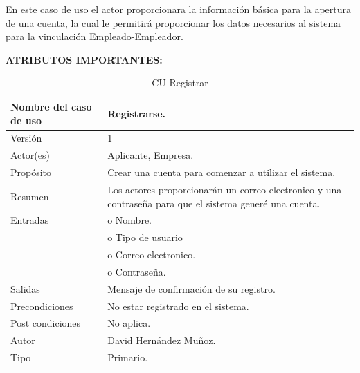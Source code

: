 En este caso de uso el actor proporcionara la información básica para la apertura de una cuenta, la cual le permitirá proporcionar los datos necesarios al sistema para la vinculación Empleado-Empleador.\newline \newline


\textbf{ATRIBUTOS IMPORTANTES:}

\begin{table}[h]			
        \begin{center}			
        \begin{tabular}{|l|p{11cm}|} \hline
        
        			
Nombre del caso de uso	&	Registrarse.	\\ \hline
Versión	&	1	\\ \hline
Actor(es)	&	Aplicante, Empresa.	\\ \hline
Propósito	&	Crear una cuenta para comenzar a utilizar el sistema.	\\ \hline
Resumen	&	Los actores proporcionarán un correo electronico y una contraseña para que el sistema generé una cuenta.	\\ \hline
Entradas	&	o         Nombre.	\\ 
	&	o         Tipo de usuario	\\
	&	o         Correo electronico.	\\
	&	o         Contraseña.	\\ \hline
Salidas	&	Mensaje de confirmación de su registro.	\\ \hline
Precondiciones	&	No estar registrado en el sistema.	\\ \hline
Post condiciones	&	No aplica.	\\ \hline
Autor	&	David Hernández Muñoz.	\\ \hline
Tipo	&	Primario.	\\ \hline



\end{tabular}			
        \caption	{	CU Registrar	}
        \label	{tabla	1	}
        \end{center}			
\end{table}			


